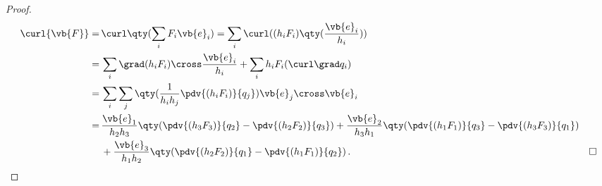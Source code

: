 \documentclass{article}
\theoremstyle{plain}\theoremheaderfont{\normalfont\itshape}\theorembodyfont{\rmfamily}\theoremseparator{.}\newtheorem*{rem}{Remark}\newtheorem*{ex}{Example}\newtheorem*{proof}{Proof}\newtheorem*{altp}{Alternative proof}
\theoremstyle{plain}\theoremheaderfont{\normalfont\bfseries}\theorembodyfont{\rmfamily}\theoremseparator{.}\newtheorem{thm}{Theorem}[section]\newtheorem{lem}[thm]{Lemma}\newtheorem{prop}[thm]{Proposition}\newtheorem*{cor}{Corollary}\newtheorem{defn}[thm]{Definition}\newtheorem{clm}[thm]{Claim}\newtheorem{clminproof}{Claim}
\theoremstyle{break}\theoremheaderfont{\normalfont\itshape}\theorembodyfont{\rmfamily}\theoremseparator{.\medskip}\newtheorem*{proofskip}{Proof}\newtheorem*{exs}{Examples}\newtheorem*{rems}{Remarks}
\theoremstyle{break}\theoremheaderfont{\normalfont\bfseries}\theorembodyfont{\rmfamily}\theoremseparator{.\medskip}\newtheorem{lemskip}[thm]{Lemma}\newtheorem{defnskip}[thm]{Definition}\newtheorem{propskip}[thm]{Proposition}\newtheorem{thmskip}[thm]{Theorem}
\numberwithin{equation}{section}
\newcommand{\qed}{\hfill\ensuremath{\Box}}
\begin{document}
	\begin{proof}
		\begin{align*}
			\curl{\vb{F}}=\,&\curl\qty(\sum_{i}F_i\vb{e}_i)=\sum_i\curl((h_iF_i)\qty(\frac{\vb{e}_i}{h_i}))\\
			=\,&\sum_{i}\grad(h_iF_i)\cross\frac{\vb{e}_i}{h_i}+\sum_{i}h_iF_i(\curl\grad q_i)\\
			=\,&\sum_{i}\sum_{j}\qty(\frac{1}{h_ih_j}\pdv{(h_iF_i)}{q_j})\vb{e}_j\cross\vb{e}_i\\
			=\,&\frac{\vb{e}_1}{h_2h_3}\qty(\pdv{(h_3F_3)}{q_2}-\pdv{(h_2F_2)}{q_3})+\frac{\vb{e}_2}{h_3h_1}\qty(\pdv{(h_1F_1)}{q_3}-\pdv{(h_3F_3)}{q_1})\\
			&+\frac{\vb{e}_3}{h_1h_2}\qty(\pdv{(h_2F_2)}{q_1}-\pdv{(h_1F_1)}{q_2})\,. & \qed
		\end{align*}
	\end{proof}
\end{document}

